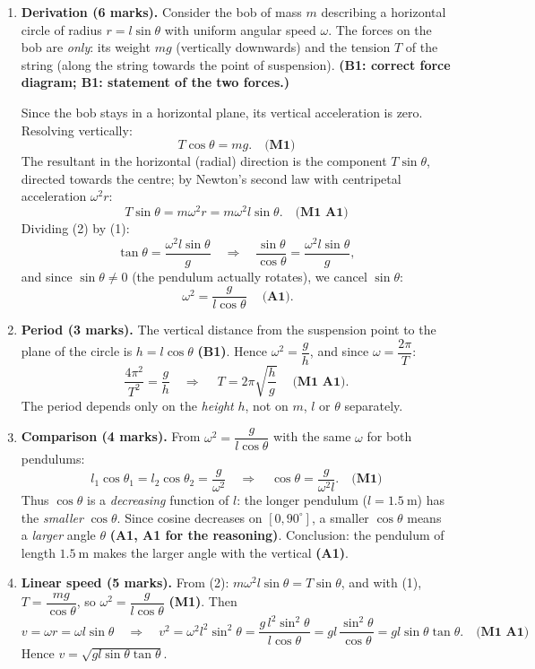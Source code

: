 \documentclass[11pt]{article}
\begin{document}
\begin{corrige}
\begin{enumerate}
\item \textbf{Derivation (6 marks).} Consider the bob of mass $m$ describing a horizontal circle of radius $r = l\sin\theta$ with uniform angular speed $\omega$. The forces on the bob are \emph{only}: its weight $mg$ (vertically downwards) and the tension $T$ of the string (along the string towards the point of suspension). \textbf{(B1: correct force diagram; B1: statement of the two forces.)}

Since the bob stays in a horizontal plane, its vertical acceleration is zero. Resolving vertically:
\[ T\cos\theta = mg. \tag{1} \quad \textbf{(M1)} \]
The resultant in the horizontal (radial) direction is the component $T\sin\theta$, directed towards the centre; by Newton's second law with centripetal acceleration $\omega^{2}r$:
\[ T\sin\theta = m\omega^{2}r = m\omega^{2}l\sin\theta. \tag{2} \quad \textbf{(M1 A1)} \]
Dividing (2) by (1):
\[ \tan\theta = \frac{\omega^{2}l\sin\theta}{g} \quad\Longrightarrow\quad \frac{\sin\theta}{\cos\theta} = \frac{\omega^{2}l\sin\theta}{g}, \]
and since $\sin\theta \neq 0$ (the pendulum actually rotates), we cancel $\sin\theta$:
\[ \boxed{\ \omega^{2} = \frac{g}{l\cos\theta}\ } \quad \textbf{(A1)}. \]
\item \textbf{Period (3 marks).} The vertical distance from the suspension point to the plane of the circle is $h = l\cos\theta$ \textbf{(B1)}. Hence $\omega^{2} = \dfrac{g}{h}$, and since $\omega = \dfrac{2\pi}{T}$:
\[ \frac{4\pi^{2}}{T^{2}} = \frac{g}{h} \quad\Longrightarrow\quad \boxed{\ T = 2\pi\sqrt{\frac{h}{g}}\ } \quad \textbf{(M1 A1)}. \]
The period depends only on the \emph{height} $h$, not on $m$, $l$ or $\theta$ separately.
\item \textbf{Comparison (4 marks).} From $\omega^{2} = \dfrac{g}{l\cos\theta}$ with the same $\omega$ for both pendulums:
\[ l_{1}\cos\theta_{1} = l_{2}\cos\theta_{2} = \frac{g}{\omega^{2}} \quad\Longrightarrow\quad \cos\theta = \frac{g}{\omega^{2}l}. \quad \textbf{(M1)} \]
Thus $\cos\theta$ is a \emph{decreasing} function of $l$: the longer pendulum ($l = 1.5\ \mathrm{m}$) has the \emph{smaller} $\cos\theta$. Since cosine decreases on $[0, 90^{\circ}]$, a smaller $\cos\theta$ means a \emph{larger} angle $\theta$ \textbf{(A1, A1 for the reasoning)}. Conclusion: the pendulum of length $1.5\ \mathrm{m}$ makes the larger angle with the vertical \textbf{(A1)}.
\item \textbf{Linear speed (5 marks).} From (2): $m\omega^{2}l\sin\theta = T\sin\theta$, and with (1), $T = \dfrac{mg}{\cos\theta}$, so $\omega^{2} = \dfrac{g}{l\cos\theta}$ \textbf{(M1)}. Then
\[ v = \omega r = \omega l\sin\theta \quad\Longrightarrow\quad v^{2} = \omega^{2}l^{2}\sin^{2}\theta = \frac{g\,l^{2}\sin^{2}\theta}{l\cos\theta} = gl\,\frac{\sin^{2}\theta}{\cos\theta} = gl\sin\theta\tan\theta. \quad \textbf{(M1 A1)} \]
Hence $\boxed{v = \sqrt{gl\sin\theta\tan\theta}}$.


\end{enumerate}
\end{corrige}
\end{document}
